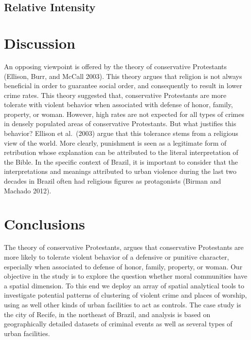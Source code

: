 \documentclass[smallextended]{svjour3}       %
\begin{document}
\hypertarget{relative-intensity-1}{%
\subsection{Relative Intensity}\label{relative-intensity-1}}

\hypertarget{discussion}{%
\section{Discussion}\label{discussion}}

An opposing viewpoint is offered by the theory of conservative
Protestants (Ellison, Burr, and McCall 2003). This theory argues that
religion is not always beneficial in order to guarantee social order,
and consequently to result in lower crime rates. This theory suggested
that, conservative Protestants are more tolerate with violent behavior
when associated with defense of honor, family, property, or woman.
However, high rates are not expected for all types of crimes in densely
populated areas of conservative Protestants. But what justifies this
behavior? Ellison et al.~(2003) argue that this tolerance stems from a
religious view of the world. More clearly, punishment is seen as a
legitimate form of retribution whose explanation can be attributed to
the literal interpretation of the Bible. In the specific context of
Brazil, it is important to consider that the interpretations and
meanings attributed to urban violence during the last two decades in
Brazil often had religious figures as protagonists (Birman and Machado
2012).

\hypertarget{conclusions}{%
\section{Conclusions}\label{conclusions}}

The theory of conservative Protestants, argues that conservative
Protestants are more likely to tolerate violent behavior of a defensive
or punitive character, especially when associated to defense of honor,
family, property, or woman. Our objective in the study is to explore the
question whether moral communities have a spatial dimension. To this end
we deploy an array of spatial analytical tools to investigate potential
patterns of clustering of violent crime and places of worship, using as
well other kinds of urban facilities to act as controls. The case study
is the city of Recife, in the northeast of Brazil, and analysis is based
on geographically detailed datasets of criminal events as well as
several types of urban facilities.
\end{document}
